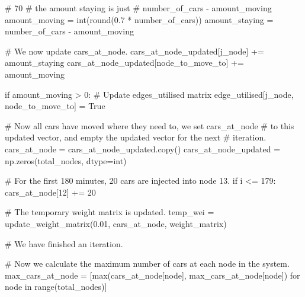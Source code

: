 \documentclass[paper=a4, fontsize=12pt]{scrartcl} %
\numberwithin{equation}{section}       %
\numberwithin{figure}{section}         %
\numberwithin{table}{section}          %
\begin{document}
\begin{python}
                # 70%
                # the amount staying is just 
                # number_of_cars - amount_moving
                amount_moving = int(round(0.7 * number_of_cars))
                amount_staying = number_of_cars - amount_moving

                # We now update cars_at_node.
                cars_at_node_updated[j_node] += amount_staying
                cars_at_node_updated[node_to_move_to] += amount_moving

                if amount_moving > 0:
                    # Update edges_utilised matrix
                    edge_utilised[j_node, node_to_move_to] = True

        # Now all cars have moved where they need to, we set cars_at_node
        # to this updated vector, and empty the updated vector for the next
        # iteration.
        cars_at_node = cars_at_node_updated.copy()
        cars_at_node_updated = np.zeros(total_nodes, dtype=int)

        # For the first 180 minutes, 20 cars are injected into node 13.
        if i <= 179:
            cars_at_node[12] += 20

        # The temporary weight matrix is updated.
        temp_wei = update_weight_matrix(0.01, cars_at_node, weight_matrix)

        # We have finished an iteration.

       # Now we calculate the maximum number of cars at each node in the system.
        max_cars_at_node = [max(cars_at_node[node], max_cars_at_node[node]) 
                            for node in range(total_nodes)]
\end{python}
\end{document}
